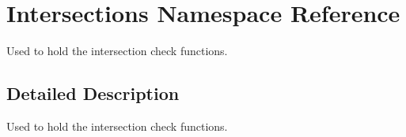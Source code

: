 \hypertarget{namespace_intersections}{\section{Intersections Namespace Reference}
\label{namespace_intersections}
}


Used to hold the intersection check functions.  




\subsection{Detailed Description}
Used to hold the intersection check functions. 